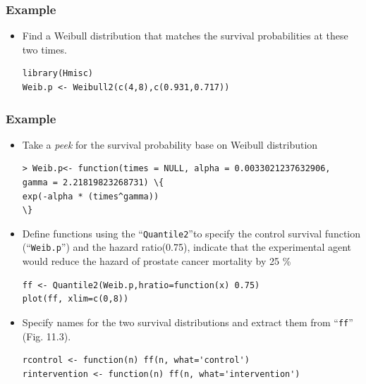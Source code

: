 \documentclass{beamer}
\newcommand{\empr}[1]{{\emph{\color{red}#1}}}
\begin{document}
\pagebreak
\begin{frame}[fragile]
\frametitle{Example}
\begin{itemize}
\begin{Verbatim}
> attach(prostateSurvival)
> prost.66to74.poor <- prostateSurvival[\{\{grade == "poor"\} \&
\{\{ageGroup == "70-74"\} | \{ageGroup == "66-69"\}\} \&
\{stage == "T2"\}\},]
> library(survival)
> status.prost <- as.numeric(prost.66to74.poor$status == 1)
> result.prost.survfit <- survfit(Surv(survTime, status.
prost) ~ 1, data=prost.66to74.poor)
> summary(result.prost.survfit, time=c(48, 96))
time  n.risk  n.event  survival  std.err  lower95% CI  upper95% CI 
 48     154      16     0.931     0.0171     0.898        0.965
 96      26      17     0.717     0.0565     0.615        0.837
\end{Verbatim}
\item Find a Weibull distribution that matches the survival probabilities at
these two times.
\begin{Verbatim}
library(Hmisc)
Weib.p <- Weibull2(c(4,8),c(0.931,0.717))
\end{Verbatim}
\end{itemize}
\end{frame}

\pagebreak
\begin{frame}[fragile]
\frametitle{Example}
\begin{itemize}
\item Take a \empr{peek} for the survival probability base on Weibull distribution
\begin{Verbatim}
> Weib.p<- function(times = NULL, alpha = 0.0033021237632906, 
gamma = 2.21819823268731) \{
exp(-alpha * (times^gamma))
\}
\end{Verbatim}
\item Define functions using the ``\texttt{Quantile2}''to specify the control survival function (``\texttt{Weib.p}'') and the hazard ratio(0.75), indicate that the experimental agent would reduce the hazard of prostate cancer mortality by 25 \%
\begin{Verbatim}
ff <- Quantile2(Weib.p,hratio=function(x) 0.75)
plot(ff, xlim=c(0,8))
\end{Verbatim}
\item Specify names for the two survival distributions and extract them from ``\texttt{ff}'' (Fig. 11.3).
\begin{Verbatim}
rcontrol <- function(n) ff(n, what='control')
rintervention <- function(n) ff(n, what='intervention')
\end{Verbatim}
\end{itemize}
\end{frame}
\end{document}
